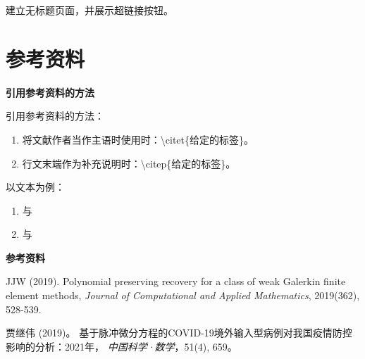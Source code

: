 \documentclass[12pt, aspectratio=169]{beamer}
\begin{document}
\begin{frame}

	建立无标题页面，并展示超链接按钮。
	
	\bigskip
	
	\hyperlink{链接的文字}{}
	
\end{frame}

\section{参考资料}
\linespread{1} 
\begin{frame}{\textbf{引用参考资料的方法}}
\linespread{1.5}

	引用参考资料的方法：
	
	\begin{enumerate}[1]
		\item 将文献作者当作主语时使用时：\textbackslash citet\{给定的标签\}。
		\item 行文末端作为补充说明时：\textbackslash citep\{给定的标签\}。
	\end{enumerate}
	
	\bigskip
	
	以文本为例：
	
	\begin{enumerate}[1]
		\item \citet{Polynomial_Galerkin} 与 \citet{脉冲微分方程COVID-19}
		\item \citep{Polynomial_Galerkin} 与 \citep{脉冲微分方程COVID-19}
	\end{enumerate}
	
\end{frame}


\linespread{1} 
\begin{frame}{\textbf{参考资料}}
\linespread{1.5} 

\footnotesize

\begin{thebibliography}{99} 

		JJW (2019). 
		\newblock Polynomial preserving recovery for a class of weak Galerkin finite element methods, 
		\newblock \emph{Journal of Computational and Applied Mathematics}, 2019(362), 528-539. 

		贾继伟 (2019)。 
		\newblock 基于脉冲微分方程的COVID-19境外输入型病例对我国疫情防控影响的分析：2021年，
		\newblock \emph{中国科学·数学}，51(4), 659。
		
\end{thebibliography}

\end{frame}
\end{document}

